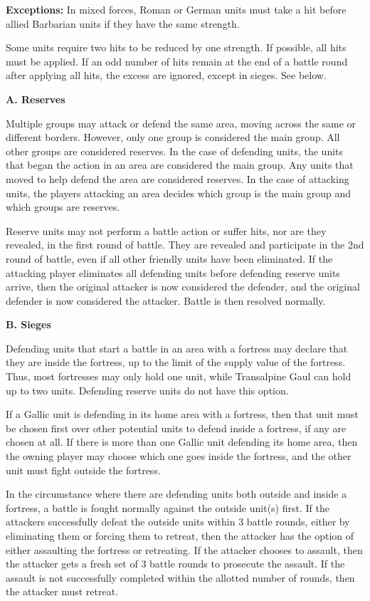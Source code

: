 \textbf{Exceptions:} In mixed forces, Roman or German units must take a hit before allied Barbarian units if they have the same strength.

Some units require two hits to be reduced by one strength. If possible, all hits must be applied. If an odd number of hits remain at the end of a battle round after applying all hits, the excess are ignored, except in sieges. See below.

\textbf{A. Reserves}

Multiple groups may attack or defend the same area, moving across the same or different borders. However, only one group is considered the main group. All other groups are considered reserves. In the case of defending units, the units that began the action in an area are considered the main group. Any units that moved to help defend the area are considered reserves. In the case of attacking units, the players attacking an area decides which group is the main group and which groups are reserves.

Reserve units may not perform a battle action or suffer hits, nor are they revealed, in the first round of battle. They are revealed and participate in the 2nd round of battle, even if all other friendly units have been eliminated. If the attacking player eliminates all defending units before defending reserve units arrive, then the original attacker is now considered the defender, and the original defender is now considered the attacker. Battle is then resolved normally.

\textbf{B. Sieges}
\par
Defending units that start a battle in an area with a fortress may declare that they are inside the fortress, up to the limit of the supply value of the fortress. Thus, most fortresses may only hold one unit, while Transalpine Gaul can hold up to two units. Defending reserve units do not have this option.

If a Gallic unit is defending in its home area with a fortress, then that unit must be chosen first over other potential units to defend inside a fortress, if any are chosen at all. If there is more than one Gallic unit defending its home area, then the owning player may choose which one goes inside the fortress, and the other unit must fight outside the fortress.

In the circumstance where there are defending units both outside and inside a fortress, a battle is fought normally against the outside unit(s) first. If the attackers successfully defeat the outside units within 3 battle rounds, either by eliminating them or forcing them to retreat, then the attacker has the option of either assaulting the fortress or retreating. If the attacker chooses to assault, then the attacker gets a fresh set of 3 battle rounds to prosecute the assault. If the assault is not successfully completed within the allotted number of rounds, then the attacker must retreat.

